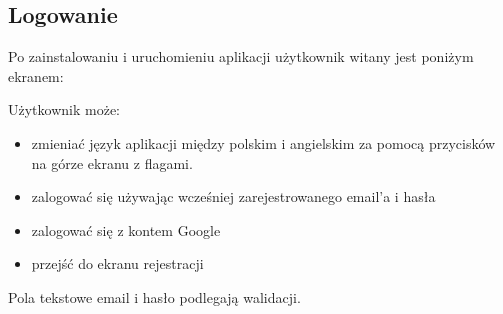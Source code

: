 \documentclass[12pt]{article}
\begin{document}
\subsection{Logowanie}
Po zainstalowaniu i uruchomieniu aplikacji użytkownik witany jest poniżym ekranem:
\begin{figure}[!htb]
    \centering
    \centering
\end{figure}
Użytkownik może:
\begin{itemize}
    \item zmieniać język aplikacji między polskim i angielskim za pomocą przycisków na górze ekranu z flagami. 
    \item zalogować się używając wcześniej zarejestrowanego email'a i hasła
    \item zalogować się z kontem Google
    \item przejść do ekranu rejestracji
\end{itemize}
Pola tekstowe email i hasło podlegają walidacji.
\end{document}
